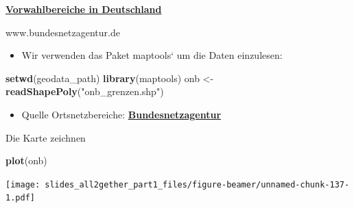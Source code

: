 \documentclass[ignorenonframetext,]{beamer}
\newenvironment{Shaded}{\begin{snugshade}}{\end{snugshade}}
\newcommand{\KeywordTok}[1]{\textcolor[rgb]{0.13,0.29,0.53}{\textbf{#1}}}
\newcommand{\StringTok}[1]{\textcolor[rgb]{0.31,0.60,0.02}{#1}}
\newcommand{\NormalTok}[1]{#1}
\providecommand{\tightlist}{%
  \setlength{\itemsep}{0pt}\setlength{\parskip}{0pt}}
\begin{document}
\begin{frame}[fragile]{\href{http://www.bundesnetzagentur.de/SharedDocs/Downloads/DE/Sachgebiete/Telekommunikation/Unternehmen_Institutionen/Nummerierung/Rufnummern/ONVerzeichnisse/ONBGrenzen/ONB_Grenzen.html}{\textbf{Vorwahlbereiche
in Deutschland}}}

\begin{block}{www.bundesnetzagentur.de}

\begin{itemize}
\tightlist
\item
  Wir verwenden das Paket maptools` um die Daten einzulesen:
\end{itemize}

\begin{Shaded}
\begin{Highlighting}[]
\KeywordTok{setwd}\NormalTok{(geodata_path)}
\KeywordTok{library}\NormalTok{(maptools)}
\NormalTok{onb <-}\StringTok{ }\KeywordTok{readShapePoly}\NormalTok{(}\StringTok{"onb_grenzen.shp"}\NormalTok{)}
\end{Highlighting}
\end{Shaded}

\begin{itemize}
\tightlist
\item
  Quelle Ortsnetzbereiche:
  \href{http://www.bundesnetzagentur.de/DE/Sachgebiete/Telekommunikation/Unternehmen_Institutionen/Nummerierung/Rufnummern/ONVerzeichnisse/GISDaten_ONBGrenzen/ONBGrenzen_Basepage.html}{\textbf{Bundesnetzagentur}}
\end{itemize}

\end{block}

\end{frame}

\begin{frame}[fragile]{Die Karte zeichnen}

\begin{Shaded}
\begin{Highlighting}[]
\KeywordTok{plot}\NormalTok{(onb)}
\end{Highlighting}
\end{Shaded}

\texttt{[image: slides\_all2gether\_part1\_files/figure-beamer/unnamed-chunk-137-1.pdf]}

\end{frame}
\end{document}
